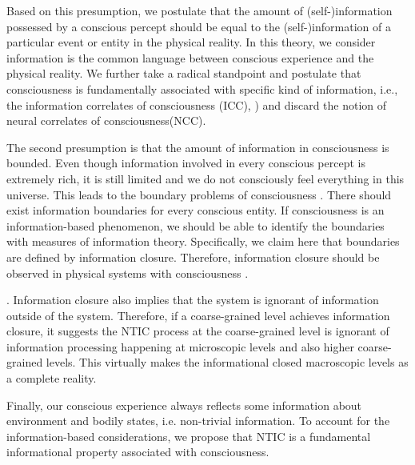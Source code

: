 \documentclass[utf8]{article}
\begin{document}
        Based on this presumption, we postulate that the amount of (self-)information possessed by a conscious percept should be equal to the (self-)information of a particular event or entity in the physical reality. In this theory, we consider information is the common language between conscious experience and the physical reality. We further take a radical standpoint and postulate that consciousness is fundamentally associated with specific kind of information, i.e., the information correlates of consciousness (ICC), \cite{chalmers1996conscious, tononi2004information, gamez2011information, Gamez2016}) and discard the notion of neural correlates of consciousness(NCC). 
        
        The second presumption is that the amount of information in consciousness is bounded. Even though information involved in every conscious percept is extremely rich, it is still limited and we do not consciously feel everything in this universe. This leads to the boundary problems of consciousness \cite{goff2006experiences}. There should exist information boundaries for every conscious entity. If consciousness is an information-based phenomenon, we should be able to identify the boundaries with measures of information theory. Specifically, we claim here that boundaries are defined by information closure. Therefore, information closure should be observed in physical systems with consciousness . 
        
        
        . 
        Information closure also implies that the system is ignorant of information outside of the system. Therefore, if a coarse-grained level achieves information closure, it suggests the NTIC process at the coarse-grained level is ignorant of information processing happening at microscopic levels and also higher coarse-grained levels. This virtually makes the informational closed macroscopic levels as a complete reality. 
        
        Finally, our conscious experience always reflects some information about environment and bodily states, i.e. non-trivial information. To account for the information-based considerations, we propose that NTIC is a fundamental informational property associated with consciousness. 
        
\end{document}
